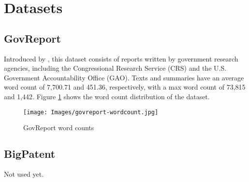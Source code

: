 \section{Datasets}
\label{sec:datasets}

\subsection*{GovReport}

Introduced by \citet{huang-etal-2021-efficient}, this dataset consists of
reports written by government research agencies, including the Congressional
Research Service (CRS) and the U.S. Government Accountability Office (GAO).
Texts and summaries have an average word count of 7,700.71 and 451.36,
respectively, with a max word count of 73,815 and 1,442.
Figure \ref{fig:govreport} shows the word count distribution of the dataset.

\begin{figure}[!ht]
	\centering
	\texttt{[image: Images/govreport-wordcount.jpg]}
	\caption{GovReport word counts}
	\label{fig:govreport}
\end{figure}


\subsection*{BigPatent}

Not used yet. \nocite{sharma-etal-2019-bigpatent}
